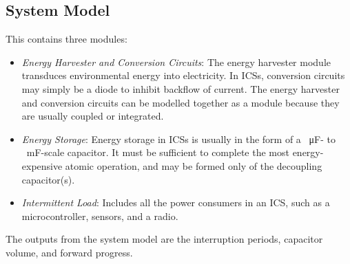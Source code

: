 \subsection{System Model}

This contains three modules:
\begin{itemize}
    \item \textit{Energy Harvester and Conversion Circuits}: The energy harvester module transduces environmental energy into electricity. 
    In ICSs, conversion circuits may simply be a diode to inhibit backflow of current.
    The energy harvester and conversion circuits can be modelled together as a module because they are usually coupled or integrated. 
    \item \textit{Energy Storage}: Energy storage in ICSs is usually in the form of a \SI{}{\micro\farad}-  to \SI{}{\milli\farad}-scale capacitor. It must be sufficient to complete the most energy-expensive atomic operation, and may be formed only of the decoupling capacitor(s). 
    \item \textit{Intermittent Load}: Includes all the power consumers in an ICS, such as a microcontroller, sensors, and a radio. 
\end{itemize}

The outputs from the system model are the interruption periods, capacitor volume, and forward progress.

